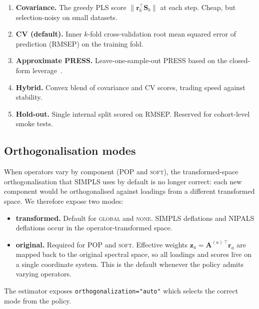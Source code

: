 \documentclass[review,a4paper]{elsarticle}
\newcommand{\Amat}{\mathbf{A}}
\newcommand{\Smat}{\mathbf{S}}
\newcommand{\zvec}{\mathbf{z}}
\newcommand{\rvec}{\mathbf{r}}
\newcommand{\POP}{\textsc{POP}\xspace}
\newcommand{\PLS}{\textsc{PLS}\xspace}
\newcommand{\NIPALS}{\textsc{NIPALS}\xspace}
\newcommand{\SIMPLS}{\textsc{SIMPLS}\xspace}
\begin{document}
\begin{enumerate}[leftmargin=2em]
  \item \textbf{Covariance.} The greedy \PLS score
  $\|\rvec_b^\top \Smat_b\|$ at each step. Cheap, but
  selection-noisy on small datasets.
  \item \textbf{CV (default).} Inner $k$-fold cross-validation root
  mean squared error of prediction (RMSEP) on the training fold.
  \item \textbf{Approximate PRESS.} Leave-one-sample-out PRESS based on
  the closed-form leverage~\cite{krzanowski1987cv}.
  \item \textbf{Hybrid.} Convex blend of covariance and CV scores,
  trading speed against stability.
  \item \textbf{Hold-out.} Single internal split scored on RMSEP.
  Reserved for cohort-level smoke tests.
\end{enumerate}

\subsection{Orthogonalisation modes}
When operators vary by component (\POP and \textsc{soft}), the
transformed-space orthogonalisation that \SIMPLS uses by default is
no longer correct: each new component would be orthogonalised against
loadings from a different transformed space. We therefore expose two
modes:

\begin{itemize}[leftmargin=2em]
  \item \textbf{transformed.} Default for \textsc{global} and
  \textsc{none}. \SIMPLS deflations and \NIPALS deflations occur in
  the operator-transformed space.
  \item \textbf{original.} Required for \POP and \textsc{soft}.
  Effective weights $\zvec_a=\Amat^{(a)\,\top} \rvec_a$ are mapped
  back to the original spectral space, so all loadings and scores
  live on a single coordinate system. This is the default whenever
  the policy admits varying operators.
\end{itemize}
The estimator exposes \verb|orthogonalization="auto"| which selects the
correct mode from the policy.
\end{document}

